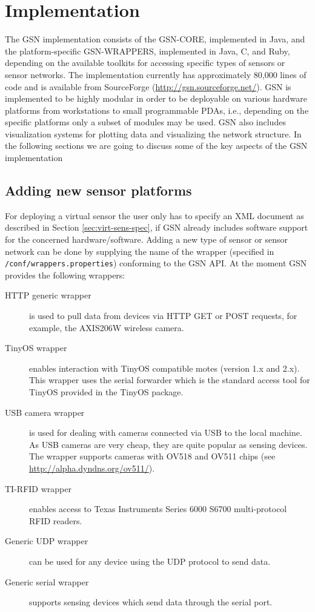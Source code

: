 \section{Implementation}
\label{sec:implementation}

The GSN implementation consists of the GSN-CORE, implemented in Java, and the
platform-specific GSN-WRAPPERS, implemented in Java, C, and Ruby, depending on
the available toolkits for accessing specific types of sensors or sensor
networks. The implementation currently has approximately 80,000 lines of code
and is available from SourceForge (\url{http://gsn.sourceforge.net/}). GSN
is implemented to be highly modular in order to be deployable on various
hardware platforms from workstations to small programmable PDAs, i.e.,
depending on the specific platforms only a subset of modules may be used. GSN
also includes visualization systems for plotting data and visualizing the
network structure. In the following sections we are going to discuss some of
the key aspects of the GSN implementation

\subsection{Adding new sensor platforms}
\label{sec:adding-new-sensor}

For deploying a virtual sensor the user only has to specify an XML document as described in Section \ref{sec:virt-sens-spec}, if GSN already
includes software support for the concerned hardware/software. Adding a new
type of sensor or sensor network can be done by supplying the name of the wrapper (specified in \texttt{/conf/wrappers.properties})
conforming to the GSN API. At the moment GSN provides the following wrappers:

\begin{description}
\item[HTTP generic wrapper] is used to pull data from devices via HTTP GET
  or POST requests, for example, the AXIS206W wireless camera.

\item[TinyOS wrapper] enables interaction with TinyOS compatible
motes (version 1.x and 2.x). This wrapper uses the serial forwarder which is
the standard access tool for TinyOS provided in the TinyOS package.

\item[USB camera wrapper] is used for dealing with cameras connected via USB 
  to the local machine. As USB cameras are very cheap, they are quite
  popular as sensing devices. The wrapper supports cameras
  with OV518 and OV511 chips (see \url{http://alpha.dyndns.org/ov511/}).
  
\item[TI-RFID wrapper] enables access to Texas Instruments Series 6000 S6700
  multi-protocol RFID readers.

\item[Generic UDP wrapper] can be used for any device using the UDP protocol to
  send data.
  
\item[Generic serial wrapper] supports sensing devices which send data through
  the serial port.
\end{description}


